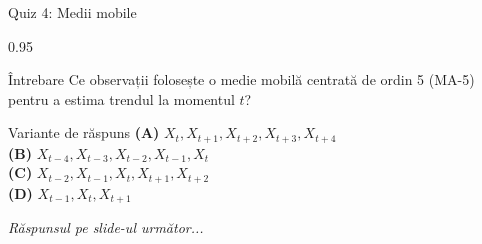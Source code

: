 \documentclass[9pt, aspectratio=169, t]{beamer}
\begin{document}
\begin{frame}{Quiz 4: Medii mobile}
    \begin{cminipage}{0.95\textwidth}
    \begin{alertblock}{Întrebare}
        Ce observații folosește o medie mobilă centrată de ordin 5 (MA-5) pentru a estima trendul la momentul $t$?
    \end{alertblock}

    \vspace{0.4cm}

    \begin{block}{Variante de răspuns}
        \textcolor{MainBlue}{\textbf{(A)}} $X_t, X_{t+1}, X_{t+2}, X_{t+3}, X_{t+4}$\\[3pt]
        \textcolor{MainBlue}{\textbf{(B)}} $X_{t-4}, X_{t-3}, X_{t-2}, X_{t-1}, X_t$\\[3pt]
        \textcolor{MainBlue}{\textbf{(C)}} $X_{t-2}, X_{t-1}, X_t, X_{t+1}, X_{t+2}$\\[3pt]
        \textcolor{MainBlue}{\textbf{(D)}} $X_{t-1}, X_t, X_{t+1}$
    \end{block}

    \vspace{0.5cm}

    \begin{center}
        \textit{Răspunsul pe slide-ul următor...}
    \end{center}
    \end{cminipage}
\end{frame}
\end{document}
